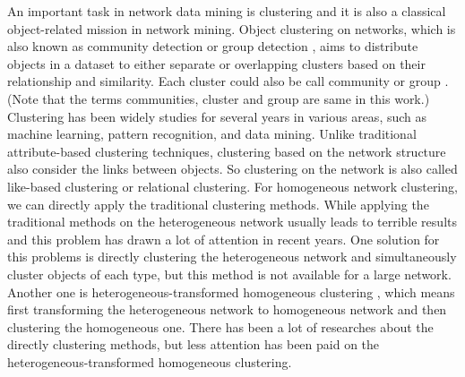 \documentclass[12pt,oneside,final]{vlsithesis}
\begin{document}

An important task in network data mining is clustering and it is also a classical object-related mission in network mining. Object clustering on networks, which is also known as community detection\cite{fortunato2010community} or group detection \cite{getoor2005link}, aims to distribute objects in a dataset to either separate or overlapping clusters\cite{han2011data} based on their relationship and similarity. Each cluster could also be call community\cite{newman2006modularity, girvan2002community}  or group \cite{getoor2005link}. (Note that the terms communities, cluster and group are same in this work.) Clustering has been widely studies for several years in various areas, such as machine learning, pattern recognition, and data mining. Unlike traditional attribute-based clustering techniques\cite{huang1998extensions, karypis1999chameleon,guha1998cure, zhang1996birch}, clustering based on the network structure also consider the links between objects. So clustering on the network is also called like-based clustering\cite{philip2010link} or relational clustering\cite{yin2006linkclus}. For homogeneous network clustering, we can directly apply the traditional clustering methods. While applying the traditional methods on the heterogeneous network usually leads to terrible results and this problem has drawn a lot of attention in recent years. One solution for this problems is directly clustering the heterogeneous network and simultaneously cluster objects of each type,  but this method is not available for a large network. Another one is heterogeneous-transformed homogeneous clustering \cite{huang2014clustering}, which means first transforming the heterogeneous network to homogeneous network and then clustering the homogeneous one. There has been a lot of researches about the directly clustering methods, but less attention has been paid on the heterogeneous-transformed homogeneous clustering. 
\end{document}
